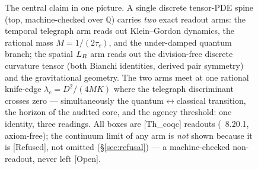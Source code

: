 \begin{figure}[t]
{%
}
\caption{The central claim in one picture. A single discrete tensor-PDE spine (top,
machine-checked over $\mathbb{Q}$) carries \emph{two} exact readout arms: the temporal
telegraph arm reads out Klein--Gordon dynamics, the rational mass $M=1/(2\tau_c)$, and the
under-damped quantum branch; the spatial $L_{R}$ arm reads out the division-free discrete
curvature tensor (both Bianchi identities, derived pair symmetry) and the gravitational
geometry. The two arms meet at one rational knife-edge $\lambda_c=D^2/(4MK)$ where the
telegraph discriminant crosses zero --- simultaneously the quantum$\leftrightarrow$classical
transition, the horizon of the audited core, and the agency threshold: one identity, three
readings. All boxes are \textsf{[Th\_coqc]} readouts (~8.20.1, axiom-free); the
continuum limit of any arm is \emph{not} shown because it is \textsf{[Refused]}, not omitted
(\S\ref{sec:refusal}) --- a machine-checked non-readout, never left \textsf{[Open]}.}
\label{fig:spine}
\end{figure}
